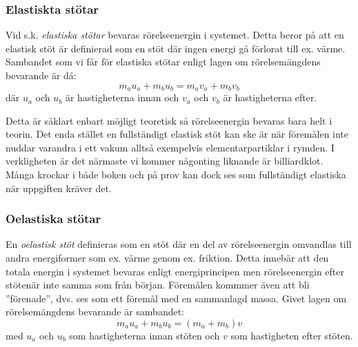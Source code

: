 \subsubsection{Elastiskta stötar}
Vid s.k. \emph{elastiska stötar} bevaras rörelseenergin i systemet. Detta beror på att en elastisk stöt är definierad som en stöt där ingen energi gå förlorat till ex. värme. Sambandet som vi får för elastiska stötar enligt lagen om rörelsemängdens bevarande är då:
\begin{equation*}
    m_au_a + m_bu_b = m_av_a + m_bv_b
\end{equation*} 
där $u_a$ och $u_b$ är hastigheterna innan och $v_a$ och $v_b$ är hastigheterna efter. 

Detta är såklart enbart möjligt teoretisk så rörelseenergin bevaras bara helt i teorin. Det enda stället en fullständigt elastisk stöt kan ske är när föremålen inte nuddar varandra i ett vakum alltså exempelvis elementarpartiklar i rymden. I verkligheten är det närmaste vi kommer någonting liknande är billiardklot. Många krockar i både boken och på prov kan dock ses som fullständigt elastiska när uppgiften kräver det.
\subsubsection{Oelastiska stötar}
En \emph{oelastisk stöt} definieras som en stöt där en del av rörelseenergin omvandlas till andra energiformer som ex. värme genom ex. friktion. Detta innebär att den totala energin i systemet bevaras enligt energiprincipen men rörelseenergin efter stötenär inte samma som från början. Föremålen kommmer även att bli ''förenade'', dvs. ses som ett föremål med en sammanlagd massa. Givet lagen om rörelsemängdens bevarande är sambandet:
\begin{equation*}
    m_au_a + m_bu_b = (m_a + m_b)v
\end{equation*}
med $u_a$ och $u_b$ som hastigheterna innan stöten och $v$ som hastigheten efter stöten.